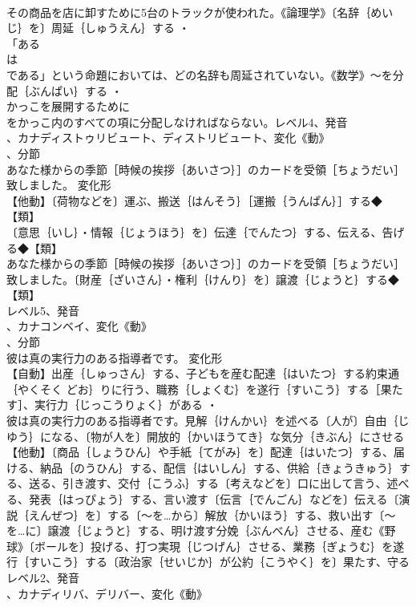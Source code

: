 \documentclass[8pt]{extreport}
\begin{document}
\begin{CJK}{UTF8}{min}
\\	その商品を店に卸すために5台のトラックが使われた。《論理学》〔名辞｛めいじ｝を〕周延｛しゅうえん｝する ・
\\	「ある
\\	は
\\	である」という命題においては、どの名辞も周延されていない。《数学》～を分配｛ぶんぱい｝する ・
\\	かっこを展開するために
\\	をかっこ内のすべての項に分配しなければならない。レベル4、発音
\\	、カナディストゥリビュート、ディストリビュート、変化《動》
\\	、分節
\\	あなた様からの季節［時候の挨拶｛あいさつ｝］のカードを受領［ちょうだい］致しました。	変化形 
\\	【他動】〔荷物などを〕運ぶ、搬送｛はんそう｝［運搬｛うんぱん｝］する◆【類】
\\	〔意思｛いし｝・情報｛じょうほう｝を〕伝達｛でんたつ｝する、伝える、告げる◆【類】
\\	あなた様からの季節［時候の挨拶｛あいさつ｝］のカードを受領［ちょうだい］致しました。〔財産｛ざいさん｝・権利｛けんり｝を〕譲渡｛じょうと｝する◆【類】
\\	レベル5、発音
\\	、カナコンベイ、変化《動》
\\	、分節
\\	彼は真の実行力のある指導者です。	変化形 
\\	【自動】出産｛しゅっさん｝する、子どもを産む配達｛はいたつ｝する約束通｛やくそく どお｝りに行う、職務｛しょくむ｝を遂行｛すいこう｝する［果たす］、実行力｛じっこうりょく｝がある ・
\\	彼は真の実行力のある指導者です。見解｛けんかい｝を述べる〔人が〕自由｛じゆう｝になる、〔物が人を〕開放的｛かいほうてき｝な気分｛きぶん｝にさせる【他動】〔商品｛しょうひん｝や手紙｛てがみ｝を〕配達｛はいたつ｝する、届ける、納品｛のうひん｝する、配信｛はいしん｝する、供給｛きょうきゅう｝する、送る、引き渡す、交付｛こうふ｝する〔考えなどを〕口に出して言う、述べる、発表｛はっぴょう｝する、言い渡す〔伝言｛でんごん｝などを〕伝える〔演説｛えんぜつ｝を〕する〔～を…から〕解放｛かいほう｝する、救い出す〔～を…に〕譲渡｛じょうと｝する、明け渡す分娩｛ぶんべん｝させる、産む《野球》〔ボールを〕投げる、打つ実現｛じつげん｝させる、業務｛ぎょうむ｝を遂行｛すいこう｝する〔政治家｛せいじか｝が公約｛こうやく｝を〕果たす、守るレベル2、発音
\\	、カナディリバ、デリバー、変化《動》

\end{CJK}
\end{document}
